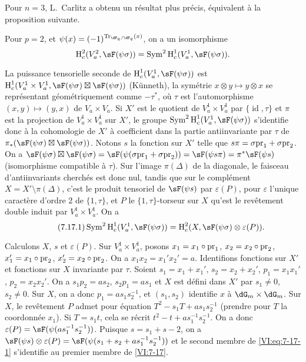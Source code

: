 Pour $n=3$, L.\ Carlitz \cite{ca69-2} a obtenu un résultat plus précis, 
équivalent à la proposition suivante. 





\begin{proposition_}\label{VI:7-17}
Pour $p=2$, et $\psi(x)=(-1)^{\tr_{\dF_q/\dF_q}(x)}$, on a un isomorphisme 
\[
  \h_c^2(V_a^2,\sF(\psi\sigma)) = \operatorname{Sym}^2 \h_c^1(V_a^1,\sF(\psi\sigma)) \text{.} 
\]
\end{proposition_}

La puissance tensorielle seconde de $\h_c^1(V_a^1,\sF(\psi\sigma))$ est 
$\h_c^1(V_a^1\times V_a^1,\sF(\psi\sigma)\boxtimes \sF(\psi\sigma))$ 
(K\"unneth), la symétrie $x\otimes y\mapsto y\otimes x$ se représentant 
géométriquement comme $-\tau^\ast$, où $\tau$ est l'automorphisme 
$(x,y)\mapsto (y,x)$ de $V_a\times V_a$. Si $X'$ est le quotient de 
$V_a^1\times V_a^1$ par $\{\operatorname{id}{},\tau\}$ et $\pi$ est la 
projection de $V_a^1\times V_a^1$ sur $X'$, le groupe 
$\operatorname{Sym}^2 \h_c^1(V_a^1,\sF(\psi\sigma))$ s'identifie donc à la 
cohomologie de $X'$ à coefficient dans la partie antiinvariante par $\tau$ de 
$\pi_\ast(\sF(\psi\sigma)\boxtimes \sF(\psi\sigma))$. Notons $s$ la fonction 
sur $X'$ telle que $s\pi =\sigma\mathrm{pr}_1+\sigma\mathrm{pr}_2$. On a 
$\sF(\psi\sigma)\boxtimes \sF(\psi\sigma) = \sF(\psi(\sigma\pr_1+\sigma\pr_2)) = \sF(\psi s \pi) = \pi^\ast \sF(\psi s)$ 
(isomorphisme compatible à $\tau$). Sur l'image $\pi(\Delta)$ de la 
diagonale, le faisceau d'antiinvariants cherchés est donc nul, tandis que sur 
le complément $X=X'\setminus \pi(\Delta)$, c'est le produit tensoriel de 
$\sF(\psi s)$ par $\varepsilon(P)$, pour $\varepsilon$ l'unique caractère 
d'ordre $2$ de $\{1,\tau\}$, et $P$ le $\{1,\tau\}$-torseur sur $X$ qu'est le 
revêtement double induit par $V_a^1\times V_a^1$. On a 
\begin{equation*}\tag{7.17.1}\label{VI:eq:7-17-1}
  \operatorname{Sym}^2 \h_c^1(V_a^1,\sF(\psi\sigma)) = \h_c^2(X,\sF(\psi\sigma)\otimes \varepsilon(P)) \text{.}
\end{equation*}

Calculons $X$, $s$ et $\varepsilon(P)$. Sur $V_a^1\times V_a^1$, posons 
$x_1=x_1\circ\mathrm{pr}_1$, $x_2=x_2\circ\mathrm{pr}_2$, $x_1'=x_1\circ \mathrm{pr}_2$, 
$x_2'=x_2\circ \mathrm{pr}_2$. On a $x_1 x_2=x_1'x_2'=a$. Identifions fonctions sur 
$X'$ et fonctions sur $X$ invariante par $\tau$. Soient $s_1=x_1+x_1'$, 
$s_2=x_2+x_2'$, $p_1=x_1 x_1'$, $p_2=x_2 x_2'$. On a $s_1 p_2 = a s_2$, 
$s_2 p_1 = a s_1$ et $X$ est défini dans $X'$ par $s_1\ne 0$, $s_2\ne 0$. Sur 
$X$, on a donc $p_1 = a s_1 s_2^{-1}$, et $(s_1,s_2)$ identifie $x$ à 
$\dG_m\times \dG_m$. Sur $X$, le revêtement $P$ admet pour équation 
$T^2-s_1 T+a s_1 s_2^{-1}$ (prendre pour $T$ la coordonnée $x_1$). Si 
$T=s_1 t$, cela se récrit $t^2-t+a s_1^{-1} s_2^{-1}$. On a donc 
$\varepsilon(P) = \sF(\psi(a s_1^{-1} s_2^{-1}))$. Puisque $s=s_1+s-2$, on a 
$\sF(\psi s)\otimes \varepsilon(P) = \sF(\psi(s_1+s_2+ a s_1^{-1} s_2^{-1}))$ 
et le second membre de \eqref{VI:eq:7-17-1} s'identifie au premier membre de 
\ref{VI:7-17}. 


